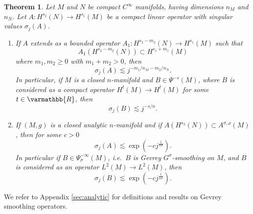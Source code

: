 \documentclass[12pt,twoside]{amsart}
\numberwithin{equation}{section}
\renewcommand{\geq}{\geqslant}
\renewcommand{\mathbb}{\varmathbb}
\newtheorem{theorem}{Theorem}[section]
\newcommand{\mR}{\mathbb{R}}                    %
\begin{document}
\begin{theorem}
\label{thm:eigenval_bds}
Let $M$ and $N$ be compact $C^{\infty}$ manifolds, having dimensions $n_M$ and $n_N$.
Let $A: H^{s_2}(N) \to H^{s_1}(M)$ be a compact linear operator with singular values $\sigma_j(A)$.
\begin{enumerate}
\item[(i)] 
If $A$ extends as a bounded operator $A_1: H^{s_2-m_2}(N) \to H^{s_1}(M)$ such that $$A_1(H^{s_2-m_2}(N)) \subset H^{s_1+m_1}(M)$$ where $m_1, m_2 \geq 0$ with $m_1+m_2 > 0$, then 
\[
\sigma_j(A) \lesssim j^{-m_1/n_M-m_2/n_N}.
\]
In particular, if $M$ is a closed $n$-manifold and $B \in \Psi^{-s}(M)$, where $B$ is considered as a compact operator $H^t(M) \to H^t(M)$ for some $t \in \mR$, then 
\[
\sigma_j(B) \lesssim j^{-s/n}.
\]
\item[(ii)] 
If $(M,g)$ is a closed analytic $n$-manifold and if $A(H^{s_2}(N)) \subset A^{\sigma,\rho}(M)$, then for some $c > 0$ 
\[
\sigma_j(A) \lesssim \exp(-cj^{\frac{1}{n \sigma}}).
\]
In particular if $B \in \Psi^{-\infty}_{\sigma}(M)$, i.e.\ $B$ is Gevrey $G^{\sigma}$-smoothing on $M$, and $B$ is considered as an operator $L^2(M) \to L^2(M)$, then 
\[
\sigma_j(B) \lesssim \exp(-cj^{\frac{1}{n \sigma}}).
\]
\end{enumerate}
\end{theorem}

We refer to Appendix \ref{sec:analytic} for definitions and results on Gevrey smoothing operators.
\end{document}
